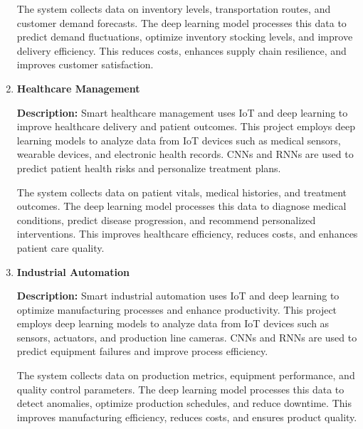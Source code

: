 \documentclass{article}
\begin{document}
\begin{enumerate}[label=\textbf{\arabic*.}, leftmargin=*]
The system collects data on inventory levels, transportation routes, and customer demand forecasts. The deep learning model processes this data to predict demand fluctuations, optimize inventory stocking levels, and improve delivery efficiency. This reduces costs, enhances supply chain resilience, and improves customer satisfaction.



\vspace{24pt} %
\item \textbf{Healthcare Management}

\textbf{Description:}
Smart healthcare management uses IoT and deep learning to improve healthcare delivery and patient outcomes. This project employs deep learning models to analyze data from IoT devices such as medical sensors, wearable devices, and electronic health records. CNNs and RNNs are used to predict patient health risks and personalize treatment plans.

The system collects data on patient vitals, medical histories, and treatment outcomes. The deep learning model processes this data to diagnose medical conditions, predict disease progression, and recommend personalized interventions. This improves healthcare efficiency, reduces costs, and enhances patient care quality.



\vspace{24pt} %
\item \textbf{Industrial Automation}

\textbf{Description:}
Smart industrial automation uses IoT and deep learning to optimize manufacturing processes and enhance productivity. This project employs deep learning models to analyze data from IoT devices such as sensors, actuators, and production line cameras. CNNs and RNNs are used to predict equipment failures and improve process efficiency.

The system collects data on production metrics, equipment performance, and quality control parameters. The deep learning model processes this data to detect anomalies, optimize production schedules, and reduce downtime. This improves manufacturing efficiency, reduces costs, and ensures product quality.


\end{enumerate}
\end{document}
